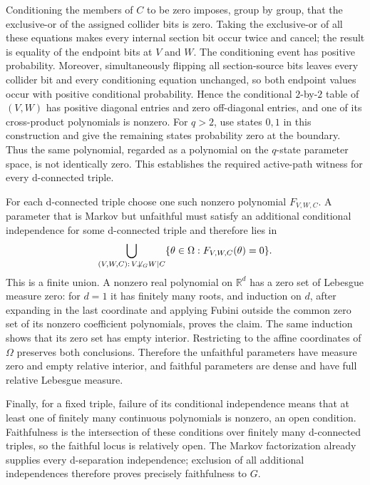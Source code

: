 Conditioning the members of \(C\) to be zero imposes, group by group, that the exclusive-or of the assigned collider bits is zero.  Taking the exclusive-or of all these equations makes every internal section bit occur twice and cancel; the result is equality of the endpoint bits at \(V\) and \(W\).  The conditioning event has positive probability.  Moreover, simultaneously flipping all section-source bits leaves every collider bit and every conditioning equation unchanged, so both endpoint values occur with positive conditional probability.  Hence the conditional \(2\)-by-\(2\) table of \((V,W)\) has positive diagonal entries and zero off-diagonal entries, and one of its cross-product polynomials is nonzero.  For \(q>2\), use states \(0,1\) in this construction and give the remaining states probability zero at the boundary.  Thus the same polynomial, regarded as a polynomial on the \(q\)-state parameter space, is not identically zero.  This establishes the required active-path witness for every d-connected triple.

For each d-connected triple choose one such nonzero polynomial \(F_{V,W,C}\).  A parameter that is Markov but unfaithful must satisfy an additional conditional independence for some d-connected triple and therefore lies in
\[
 \bigcup_{(V,W,C):\,V\not\!\perp_G W\mid C}
 \{\theta\in\Omega:F_{V,W,C}(\theta)=0\}.
\]
This is a finite union.  A nonzero real polynomial on \(\mathbb R^d\) has a zero set of Lebesgue measure zero: for \(d=1\) it has finitely many roots, and induction on \(d\), after expanding in the last coordinate and applying Fubini outside the common zero set of its nonzero coefficient polynomials, proves the claim.  The same induction shows that its zero set has empty interior.  Restricting to the affine coordinates of \(\Omega\) preserves both conclusions.  Therefore the unfaithful parameters have measure zero and empty relative interior, and faithful parameters are dense and have full relative Lebesgue measure.

Finally, for a fixed triple, failure of its conditional independence means that at least one of finitely many continuous polynomials is nonzero, an open condition.  Faithfulness is the intersection of these conditions over finitely many d-connected triples, so the faithful locus is relatively open.  The Markov factorization already supplies every d-separation independence; exclusion of all additional independences therefore proves precisely faithfulness to \(G\).
